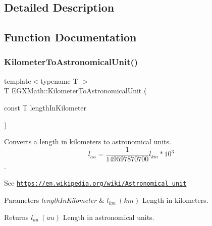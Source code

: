 \subsection{Detailed Description}


\subsection{Function Documentation}
\mbox{\label{group___e_g_x_math-_conversions-_length_conversions-_s_i-_kilometer-_astronomical_ga4c5c2b67611651c04072bfbb394a4ca7}} 
\subsubsection{\texorpdfstring{Kilometer\+To\+Astronomical\+Unit()}{KilometerToAstronomicalUnit()}}
{\footnotesize\ttfamily template$<$typename T $>$ \\
T E\+G\+X\+Math\+::\+Kilometer\+To\+Astronomical\+Unit (\begin{DoxyParamCaption}\item[{const T}]{length\+In\+Kilometer }\end{DoxyParamCaption})}



Converts a length in kilometers to astronomical units. \[ l_{au}= \frac{1}{149597870700} l_{km} * 10^{3} \]. 

See \href{https://en.wikipedia.org/wiki/Astronomical_unit}{\tt https\+://en.\+wikipedia.\+org/wiki/\+Astronomical\+\_\+unit} 
\begin{DoxyParams}{Parameters}
{\em length\+In\+Kilometer} & $ l_{km}\ (km)$ Length in kilometers. \\
\hline
\end{DoxyParams}
\begin{DoxyReturn}{Returns}
$ l_{au}\ (au)$ Length in astronomical units. 
\end{DoxyReturn}
\mbox{\label{group___e_g_x_math-_conversions-_length_conversions-_s_i-_kilometer-_astronomical_ga265181afd822c061f51a157da711c0c5}} 

